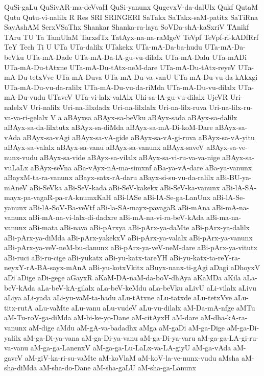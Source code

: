 {QuSi-gaLu
QuSivAR-ma-deVvaH
QuSi-yanunx
QugevxV-da-dalUlx
Qukf
QutaM
Qutu
Qutu-vi-nalilx
R
Res
SRI
SRINGERI
SaTakx
SaTakx-saM-patitx
SaTiRna
SayAshAM
SerxVSaThx
Shankar
Shanka-ra-laya
SoVDa-shA-kaSxriV
TAnikf
TAru
TU
Ta
TamUlaM
TarxsfTx
TatAyx-na-na-raMgeV
TeVpf
TeVpf-ri-kADfRrf
TeY
Tech
Ti
U
UTa
UTa-dalilx
UTakekx
UTa-mA-Da-ba-hudu
UTa-mA-Da-beVku
UTa-mA-Dade
UTa-mA-Da-lA-gu-vu-dilalx
UTa-mA-Dalu
UTa-mADi
UTa-mA-Du-tAtxne
UTa-mA-Du-tAtx-neM-dare
UTa-mA-Du-tAtx-reyeV
UTa-mA-Du-tetxVve
UTa-mA-Duva
UTa-mA-Du-va-vanU
UTa-mA-Du-vu-da-kAkxgi
UTa-mA-Du-vu-da-ralilx
UTa-mA-Du-vu-da-riMda
UTa-mA-Du-vu-dilalx
UTa-mA-Du-vudu
UTaveV
UTa-vi-lalx-valAlx
Uhi-sa-lA-gu-vu-dilalx
UjeVR
Uri-nalelxV
Uri-nalilx
Uri-na-lilxdadx
Uri-na-lilxlalx
Uri-na-lilx-ruva
Uri-na-lilx-ru-va-va-ri-gelalx
V
a
aBAyxsa
aBAyx-sa-beVku
aBAyx-sada
aBAyx-sa-dalilx
aBAyx-sa-da-lilxtutx
aBAyx-sa-diMda
aBAyx-sa-mA-Di-koM-Dare
aBAyx-sa-vAda
aBAyx-sa-vAgi
aBAyx-sa-vA-gide
aBAyx-sa-vA-gi-ruva
aBAyx-sa-vA-yitu
aBAyx-sa-valalx
aBAyx-sa-vanu
aBAyx-sa-vanunx
aBAyx-saveV
aBAyx-sa-ve-nunx-vudu
aBAyx-sa-vide
aBAyx-sa-vilalx
aBAyx-sa-vi-ru-va-va-nige
aBAyx-sa-vuLaLx
aBAyx-seVna
aBa-vAyx-nA-ma-simxnf
aBa-ya-vA-dare
aBa-ya-vanunx
aBayxM-ta-ra-vanunx
aBayx-satx-rA-daru
aBayx-si-su-vu-da-ralilx
aBi-BU-ya-mAneV
aBi-SeVka
aBi-SeV-kada
aBi-SeV-kakekx
aBi-SeV-ka-vanunx
aBi-lA-SA-mayx-pa-vagaR-pa-rA-knumxKaH
aBi-lASe
aBi-lA-Se-ga-LanUnx
aBi-lA-Se-yanunx
aBi-lA-SoV-Ba-veVtf
aBi-la-SA-mayx-pavagaR
aBi-mAna
aBi-mA-na-vanunx
aBi-mA-na-vi-lalx-di-dadxre
aBi-mA-na-vi-ra-beV-kAda
aBi-ma-na-vanunx
aBi-mata
aBi-nava
aBi-pArxya
aBi-pArx-ya-daMte
aBi-pArx-ya-dalilx
aBi-pArx-ya-diMda
aBi-pArx-yakekxV
aBi-pArx-ya-valalx
aBi-pArx-ya-vanunx
aBi-pArx-ya-veV-neM-bu-danunx
aBi-pArx-ya-veV-neM-dare
aBi-pArx-ya-vitutx
aBi-ruci
aBi-ru-cige
aBi-yukatx
aBi-yu-katx-tareYH
aBi-yu-katx-ta-reY-ra-neyxY-rA-BA-sayx-mAnA
aBi-yu-kotxVkitx
aBuyx-nanx-ti-gAgi
aDagi
aDhoyxV
aDi
aDige
aDi-gege
aGayxR
aKaM-DA-naM-da-boV-dhAya
aKaMDa
aKila
aLa-beV-kAda
aLa-beV-kA-gilalx
aLa-beV-keMdu
aLa-beVku
aLivU
aLi-vilalx
aLivu
aLiya
aLi-yada
aLi-yu-vaM-ta-hadu
aLu-tAtxne
aLu-tatxde
aLu-tetxVve
aLu-titx-rutA
aLu-vaMte
aLu-vanu
aLu-vudeV
aLu-vu-dilalx
aM-Da-mA-nfge
aMTu
aM-Tu-roV-ga-diMda
aM-bi-ke-yo-Dane
aM-citAyxH
aM-dare
aM-dha-kA-ra-vanunx
aM-dige
aMdu
aM-gA-va-badadhx
aMga
aM-gaDi
aM-ga-Dige
aM-ga-Di-yalilx
aM-ga-Di-ya-vana
aM-ga-Di-ya-vanu
aM-ga-Di-ya-varu
aM-ga-ga-LA-gi-ru-va-vanu
aM-ga-ga-LanenxV
aM-ga-ga-Lu-LaLx-va-LA-giyU
aM-ga-vAda
aM-gaveV
aM-giV-ka-ri-su-vaMte
aM-koVlaM
aM-koV-la-ve-nunx-vudu
aMsha
aM-sha-diMda
aM-sha-do-Dane
aM-sha-gaLU
aM-sha-ga-Lanunx
}
